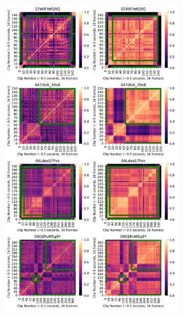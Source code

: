 \begin{figure}[h]	
    \begin{subfigure}[b]{0.45\textwidth}
        \includegraphics[width=\linewidth]{assets/img/tsp/tsp-viz-1.png}
    \end{subfigure}%
    \begin{subfigure}[b]{0.45\textwidth}

\end{subfigure}
\end{figure}
